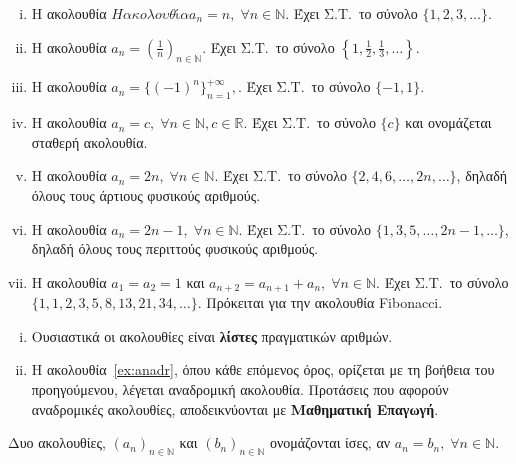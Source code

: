 \begin{examples}
\item {}
  \begin{enumerate}[i)]
    \item Η ακολουθία $ Η ακολουθία a_{n} = n, \; \forall n \in \mathbb{N} $. 
      Έχει Σ.Τ.\  το σύνολο $  \{ 1,2,3, \ldots \} $.
    \item Η ακολουθία $ a_{n}=\left(\frac{1}{n}\right)_{n \in \mathbb{N}} $. 
      Έχει Σ.Τ.\ το σύνολο $  \left\{ 1, \frac{1}{2}, \frac{1}{3}, \ldots \right\} $.
    \item Η ακολουθία $ a_{n}= \{(-1)^{n}\}_{n=1}^{+ \infty}, $. Έχει Σ.Τ.\ 
      το σύνολο $ \{ -1,1 \} $.
    \item Η ακολουθία $ a_{n} = c, \; \forall n \in \mathbb{N}, c \in \mathbb{R} $.
      Έχει Σ.Τ.\ το σύνολο $ \{ c \} $ και ονομάζεται 
      \textcolor{Col1}{σταθερή ακολουθία}.
    \item Η ακολουθία $ a_{n}=2n, \; \forall n \in \mathbb{N} $. Έχει Σ.Τ.\ το 
      σύνολο $ \{ 2,4,6, \ldots, 2n, \ldots \} $, δηλαδή όλους τους
      \textcolor{Col1}{άρτιους} φυσικούς αριθμούς.
    \item Η ακολουθία $ a_{n}= 2n-1, \; \forall n \in \mathbb{N} $. Έχει Σ.Τ.\ το 
      σύνολο $ \{ 1,3,5, \ldots, 2n-1, \ldots \} $, δηλαδή όλους τους περιττούς
      φυσικούς αριθμούς.
    \item \label{ex:anadr} Η ακολουθία $ a_{1}= a_{2} = 1 $ και $ a_{n+2}=a_{n+1}
      +a_{n}, \; \forall n \in \mathbb{N}$. Έχει Σ.Τ.\ το σύνολο 
      $ \{ 1,1,2,3,5,8, 13,21,34, \ldots\} $.  Πρόκειται για την 
      \textcolor{Col1}{ακολουθία Fibonacci}. 
  \end{enumerate}
\end{examples}

\begin{rem}
\item {}
  \begin{enumerate}[i)]
    \item Ουσιαστικά οι ακολουθίες είναι \textbf{λίστες} πραγματικών αριθμών.
    \item Η ακολουθία~\ref{ex:anadr}, όπου κάθε επόμενος όρος, ορίζεται με 
      τη βοήθεια του προηγούμενου, λέγεται
      \textcolor{Col1}{αναδρομική ακολουθία}.  Προτάσεις που αφορούν 
      αναδρομικές ακολουθίες, αποδεικνύονται με \textbf{Μαθηματική Επαγωγή}.
  \end{enumerate}
\end{rem}

\begin{mybox1}
  \begin{dfn}
    Δυο ακολουθίες, $(a_{n})_{n \in \mathbb{N}}$  και $ (b_{n})_{n \in \mathbb{N}} $ 
    ονομάζονται \textcolor{Col1}{ίσες}, αν 
    $ a_{n} = b_{n}, \; \forall n \in \mathbb{N} $.
  \end{dfn}
\end{mybox1}

